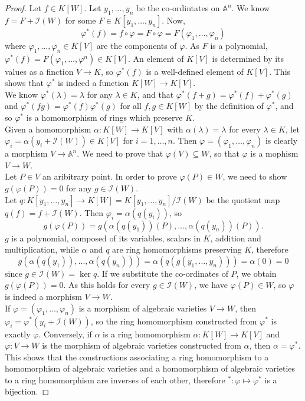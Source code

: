 \documentclass[titlepage]{article}
\theoremstyle{remark}
\renewcommand{\phi}{\varphi}
\begin{document}
  \begin{proof}
    Let $f\in K[W]$. Let $y_1,\dots,y_n$ be the co-ordintates on $\mathbb{A}^n$. We know $f=F+\mathcal{I}(W)$ for some $F\in K[y_1,\dots,y_n]$. Now,
    \[\phi^*(f)=f\circ\phi=F\circ\phi=F(\phi_1,\dots,\phi_n)\]
    where $\phi_1,\dots,\phi_n\in K[V]$ are the components of $\phi$. As $F$ is a polynomial, $\phi^*(f)=F(\phi_1,\dots,\phi^n)\in K[V]$. An element of $K[V]$ is determined by its values as a finction $V\to K$, so $\phi^*(f)$ is a well-defined element of $K[V]$. This shows that $\phi^*$ is indeed a function $K[W]\to K[V]$.\\
    We know $\phi^*(\lambda)=\lambda$ for any $\lambda\in K$, and that $\phi^*(f+g)=\phi^*(f)+\phi^*(g)$ and $\phi^*(fg)=\phi^*(f)\phi^*(g)$ for all $f,g\in K[W]$ by the definition of $\phi^*$, and so $\phi^*$ is a homomorphism of rings which preserve $K$.\\
    Given a homomorphism $\alpha:K[W]\to K[V]$ with $\alpha(\lambda)=\lambda$ for every $\lambda\in K$, let $\phi_i=\alpha(y_i+\mathcal{I}(W))\in K[V]$ for $i=1,\dots,n$. Then $\phi=(\phi_1,\dots,\phi_n)$ is clearly a morphism $V\to \mathbb{A}^n$. We need to prove that $\phi(V)\subseteq W$, so that $\phi$ is a mophism $V\to W$.\\
    Let $P\in V$ an aribitrary point. In order to prove $\phi(P)\in W$, we need to show $g(\phi(P))=0$ for any $g\in\mathcal{I}(W)$.\\
    Let $q:K[y_1,\dots,y_n]\to K[W]=K[y_1,\dots,y_n]/\mathcal{I}(W)$ be the quotient map $q(f)=f+\mathcal{I}(W)$. Then $\phi_i=\alpha(q(y_i))$, so 
    \[g(\phi(P))=g(\alpha(q(y_1))(P),\dots,\alpha(q(y_n))(P)).\]
    $g$ is a polynomial, composed of its variables, scalars in $K$, addition and multiplication, while $\alpha$ and $q$ are ring homomorphisms preserving $K$, therefore 
    \[g(\alpha(q(y_1)),\dots,\alpha(q(y_n)))=\alpha(q(g(y_1,\dots,y_n)))=\alpha(0)=0\]
    since $g\in \mathcal{I}(W)=\ker{q}$. If we substitute the co-ordinates of $P$, we obtain $g(\phi(P))=0$. As this holds for every $g\in \mathcal{I}(W)$, we have $\phi(P)\in W$, so $\phi$ is indeed a morphism $V\to W$.\\
    If $\phi=(\phi_1,\dots,\phi_n)$ is a morphism of algebraic varieties $V\to W$, then $\phi_i=\phi^*(y_i+\mathcal{I}(W))$, so the ring homomorphism constructed from $\phi^*$ is exactly $\phi$. Conversely, if $\alpha$ is a ring homomorphism $\alpha:K[W]\to K[V]$ and $\phi:V\to W$ is the morphism of algebraic varieties constructed from $\alpha$, then $\alpha=\phi^*$.\\
    This shows that the constructions associating a ring homomorphism to a homomorphism of algebraic varieties and a homomorphism of algebraic varieties to a ring homomorphism are inverses of each other, therefore $^*:\phi\mapsto\phi^*$ is a bijection.
  \end{proof}
\end{document}
